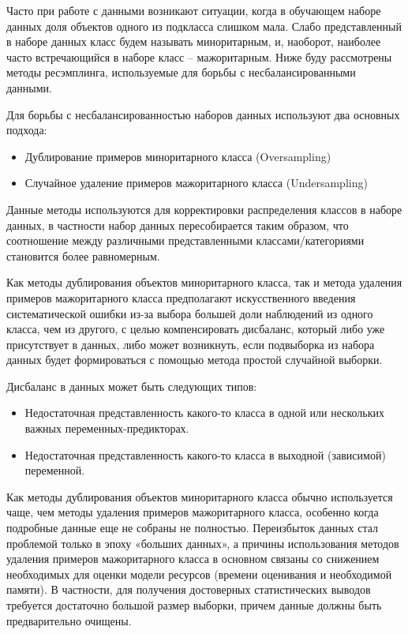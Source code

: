 \documentclass[12pt,a4paper, oneside]{extreport}
\begin{document}
Часто при работе с данными возникают ситуации, когда в обучающем наборе данных доля объектов одного из подкласса слишком мала. 
Слабо представленный в наборе данных класс будем называть миноритарным, и, наоборот,  наиболее часто встречающийся в наборе класс --  мажоритарным.
Ниже буду рассмотрены  методы ресэмплинга, используемые для борьбы с несбалансированными данными. 

Для борьбы с несбалансированностью наборов данных используют два основных подхода: 
\begin{itemize}
	\item Дублирование примеров миноритарного класса (Oversampling)
	\item Случайное удаление примеров мажоритарного класса (Undersampling) 
\end{itemize} 

Данные методы  используются для корректировки распределения классов в наборе данных, в частности набор данных пересобирается  таким образом, что соотношение между различными представленными классами/категориями становится более равномерным.

Как методы дублирования объектов миноритарного класса, так и метода удаления  примеров мажоритарного класса  предполагают искусственного  введения  систематической ошибки из-за  выбора большей доли наблюдений из одного класса, чем из другого, с целью компенсировать дисбаланс, который либо уже присутствует в данных, либо может возникнуть, если подвыборка из набора данных   будет формироваться с помощью метода простой случайной выборки. 

Дисбаланс в данных может быть следующих типов:
\begin{itemize}
	\item Недостаточная представленность какого-то класса в одной или нескольких важных переменных-предикторах. 
	\item Недостаточная представленность  какого-то   класса в выходной (зависимой) переменной. 
\end{itemize}

Как методы дублирования объектов миноритарного класса обычно используется чаще, чем методы  удаления  примеров мажоритарного класса, особенно когда подробные данные еще не собраны не полностью. 
Переизбыток данных стал проблемой только в эпоху «больших данных», а причины использования  методов  удаления  примеров мажоритарного класса  в основном связаны со  снижением необходимых  для оценки модели ресурсов (времени оценивания и необходимой памяти). 
В частности, для получения достоверных статистических выводов требуется достаточно большой размер выборки, причем  данные должны быть предварительно очищены. 
\end{document}
